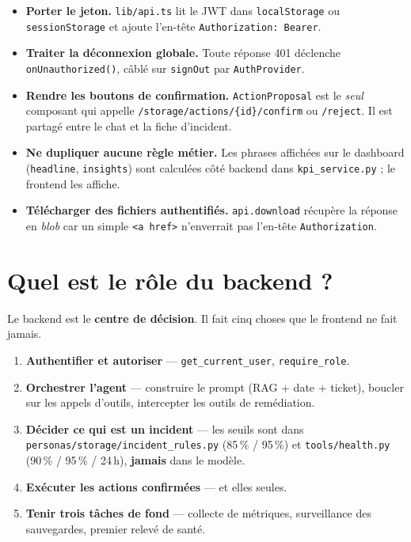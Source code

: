 \documentclass[11pt,a4paper]{report}
\newcommand{\file}[1]{\texttt{\small #1}}
\newcommand{\fn}[1]{\texttt{\small\textcolor{oasisviolet}{#1}}}
\newcommand{\cls}[1]{\texttt{\small\textcolor{oasisblue}{#1}}}
\newcommand{\route}[1]{\texttt{\small\textcolor{oasisgreen}{#1}}}
\begin{document}
\begin{itemize}
  \item \textbf{Porter le jeton.} \file{lib/api.ts} lit le JWT dans
  \texttt{localStorage} ou \texttt{sessionStorage} et ajoute l'en-tête
  \texttt{Authorization: Bearer}.
  \item \textbf{Traiter la déconnexion globale.} Toute réponse 401 déclenche
  \fn{onUnauthorized()}, câblé sur \fn{signOut} par \cls{AuthProvider}.
  \item \textbf{Rendre les boutons de confirmation.} \cls{ActionProposal} est le
  \emph{seul} composant qui appelle \route{/storage/actions/\{id\}/confirm} ou
  \route{/reject}. Il est partagé entre le chat et la fiche d'incident.
  \item \textbf{Ne dupliquer aucune règle métier.} Les phrases affichées sur le
  dashboard (\fn{headline}, \fn{insights}) sont calculées côté backend dans
  \file{kpi\_service.py} ; le frontend les affiche.
  \item \textbf{Télécharger des fichiers authentifiés.} \fn{api.download} récupère
  la réponse en \emph{blob} car un simple \texttt{<a href>} n'enverrait pas
  l'en-tête \texttt{Authorization}.
\end{itemize}

\section{Quel est le rôle du backend ?}

Le backend est le \textbf{centre de décision}. Il fait cinq choses que le
frontend ne fait jamais.

\begin{enumerate}
  \item \textbf{Authentifier et autoriser} --- \fn{get\_current\_user},
  \fn{require\_role}.
  \item \textbf{Orchestrer l'agent} --- construire le prompt (RAG + date + ticket),
  boucler sur les appels d'outils, intercepter les outils de remédiation.
  \item \textbf{Décider ce qui est un incident} --- les seuils sont dans
  \file{personas/storage/incident\_rules.py} (85\,\% / 95\,\%) et
  \file{tools/health.py} (90\,\% / 95\,\% / 24\,h), \textbf{jamais} dans le
  modèle.
  \item \textbf{Exécuter les actions confirmées} --- et elles seules.
  \item \textbf{Tenir trois tâches de fond} --- collecte de métriques,
  surveillance des sauvegardes, premier relevé de santé.
\end{enumerate}
\end{document}
